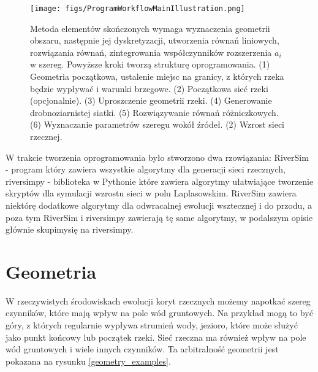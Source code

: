 \documentclass[]{pracamgr}
\begin{document}
    \begin{figure}[H]
      \centering
      \texttt{[image: figs/ProgramWorkflowMainIllustration.png]}
      \caption {Metoda elementów skończonych wymaga wyznaczenia geometrii obszaru, następnie jej dyskretyzacji, utworzenia równań liniowych, rozwiązania równań, zintegrowania współczynników rozszerzenia $a_i$ w szereg. Powyższe kroki tworzą strukturę oprogramowania. (1) Geometria początkowa, ustalenie miejsc na granicy, z których rzeka będzie wypływać i warunki brzegowe. (2) Początkowa sieć rzeki (opcjonalnie). (3) Uproszczenie geometrii rzeki. (4) Generowanie drobnoziarnistej siatki. (5) Rozwiązywanie równań różniczkowych. (6) Wyznaczanie parametrów szeregu wokół źródeł. (2) Wzrost sieci rzecznej.}
      \label{program_workflow}
    \end{figure}
      
    W trakcie tworzenia oprogramowania było stworzono dwa rzowiązania: RiverSim\cite{riversim} - program który zawiera wszystkie algorytmy dla generacji sieci rzecznych, riversimpy\cite{riversimpy} - biblioteka w Pythonie które zawiera algorytmy ułatwiające tworzenie skryptów dla symulacji wzrostu sieci w polu Laplasowskim. 
    RiverSim zawiera niektórę dodatkowe algorytmy dla odwracalnej ewolucji wsztecznej i do przodu, a poza tym RiverSim i riversimpy zawierają tę same algorytmy, w podalszym opisie głównie skupimysię na riversimpy. 

    \section{Geometria}
      
      W rzeczywistych środowiskach ewolucji koryt rzecznych możemy napotkać szereg czynników, które mają wpływ na pole wód gruntowych. Na przykład mogą to być góry, z których regularnie wypływa strumień wody, jezioro, które może służyć jako punkt końcowy lub początek rzeki. Sieć rzeczna ma również wpływ na pole wód gruntowych i wiele innych czynników. Ta arbitralność geometrii jest pokazana na rysunku \ref{geometry_examples}.
      
\end{document}
